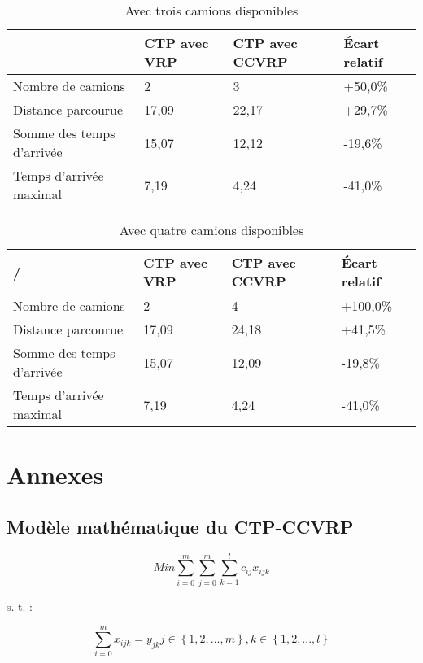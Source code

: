 \documentclass[12pt, a4paper, onecolumn, twoside,french,cleardoublepage=plain,openany]{article}
\begin{document}
\begin{table}[h] \centering
\begin{tabular}{@{}llll@{}}
\toprule %
 & CTP avec VRP & CTP avec CCVRP & Écart relatif \\ \midrule
Nombre de camions & 2 & 3 & +50,0\% \\
Distance parcourue & 17,09 & 22,17 & +29,7\% \\
Somme des temps d'arrivée & 15,07 & 12,12 & -19,6\% \\
Temps d'arrivée maximal & 7,19 & 4,24 & -41,0\% \\ \bottomrule
\end{tabular}
\caption{Avec trois camions disponibles}
\label{trois_camions}
\end{table}

\begin{table}[h] \centering
\begin{tabular}{@{}llll@{}}
\toprule %
/ & CTP avec VRP & CTP avec CCVRP & Écart relatif \\ \midrule
Nombre de camions & 2 & 4 & +100,0\% \\
Distance parcourue & 17,09 & 24,18 & +41,5\% \\
Somme des temps d'arrivée & 15,07 & 12,09 & -19,8\% \\
Temps d'arrivée maximal & 7,19 & 4,24 & -41,0\% \\ \bottomrule
\end{tabular}
\caption{Avec quatre camions disponibles}
\label{quatre_camions}
\end{table}

\section*{Annexes}
\subsection{Modèle mathématique du CTP-CCVRP}\label{modele}
\begin{equation}
Min \sum_{i=0}^{m}\sum_{j=0}^{m}\sum_{k=1}^{l}c_{ij}x_{ijk}
\end{equation}

s. t. :

\begin{equation}
\sum_{i=0}^{m}x_{ijk} = y_{jk}   j\in\left\{1,2,...,m\right\}, k\in\left\{1,2,...,l\right\}
\end{equation}
\end{document}
